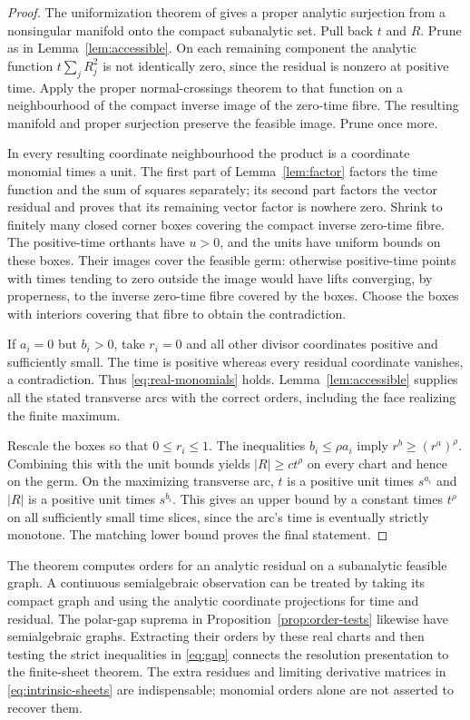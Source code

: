 \begin{proof}
The uniformization theorem of \cite[Theorem 0.1]{BM} gives a proper analytic surjection from a nonsingular manifold onto the compact subanalytic set. Pull back $t$ and $R$. Prune as in Lemma~\ref{lem:accessible}. On each remaining component the analytic function $t\sum_jR_j^2$ is not identically zero, since the residual is nonzero at positive time. Apply the proper normal-crossings theorem \cite[Corollary 4.9]{BM} to that function on a neighbourhood of the compact inverse image of the zero-time fibre. The resulting manifold and proper surjection preserve the feasible image. Prune once more.

In every resulting coordinate neighbourhood the product is a coordinate monomial times a unit. The first part of Lemma~\ref{lem:factor} factors the time function and the sum of squares separately; its second part factors the vector residual and proves that its remaining vector factor is nowhere zero. Shrink to finitely many closed corner boxes covering the compact inverse zero-time fibre. The positive-time orthants have $u>0$, and the units have uniform bounds on these boxes. Their images cover the feasible germ: otherwise positive-time points with times tending to zero outside the image would have lifts converging, by properness, to the inverse zero-time fibre covered by the boxes. Choose the boxes with interiors covering that fibre to obtain the contradiction.

If $a_i=0$ but $b_i>0$, take $r_i=0$ and all other divisor coordinates positive and sufficiently small. The time is positive whereas every residual coordinate vanishes, a contradiction. Thus \eqref{eq:real-monomials} holds. Lemma~\ref{lem:accessible} supplies all the stated transverse arcs with the correct orders, including the face realizing the finite maximum.

Rescale the boxes so that $0\le r_i\le1$. The inequalities $b_i\le\rho a_i$ imply $r^b\ge(r^a)^\rho$. Combining this with the unit bounds yields $|R|\ge c t^\rho$ on every chart and hence on the germ. On the maximizing transverse arc, $t$ is a positive unit times $s^{a_i}$ and $|R|$ is a positive unit times $s^{b_i}$. This gives an upper bound by a constant times $t^\rho$ on all sufficiently small time slices, since the arc's time is eventually strictly monotone. The matching lower bound proves the final statement.
\end{proof}
The theorem computes orders for an analytic residual on a subanalytic feasible graph. A continuous semialgebraic observation can be treated by taking its compact graph and using the analytic coordinate projections for time and residual. The polar-gap suprema in Proposition~\ref{prop:order-tests} likewise have semialgebraic graphs. Extracting their orders by these real charts and then testing the strict inequalities in \eqref{eq:gap} connects the resolution presentation to the finite-sheet theorem. The extra residues and limiting derivative matrices in \eqref{eq:intrinsic-sheets} are indispensable; monomial orders alone are not asserted to recover them.

